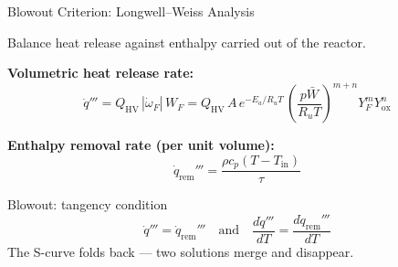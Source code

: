 \documentclass[12pt,aspectratio=169]{beamer}
\newcommand{\taures}{\tau}
\newcommand{\Tin}{T_{\text{in}}}
\begin{document}
\begin{frame}{Blowout Criterion: Longwell--Weiss Analysis}

  Balance heat release against enthalpy carried out of the reactor.

  \medskip
  \textbf{Volumetric heat release rate:}
  \[
    \dot{q}''' = Q_{\text{HV}}\,|\dot{\omega}_F|\,W_F
    = Q_{\text{HV}}\,A\,e^{-E_a/R_u T}\,
      \left(\frac{p\bar{W}}{R_u T}\right)^{m+n}
      Y_F^m Y_{\text{ox}}^n
  \]

  \textbf{Enthalpy removal rate (per unit volume):}
  \[
    \dot{q}_{\text{rem}}''' = \frac{\rho c_p (T-\Tin)}{\taures}
  \]

  \begin{alertblock}{Blowout: tangency condition}
    \[
      \dot{q}''' = \dot{q}_{\text{rem}}'''
      \quad \text{and} \quad
      \frac{d\dot{q}'''}{dT} = \frac{d\dot{q}_{\text{rem}}'''}{dT}
    \]
    The S-curve folds back --- two solutions merge and disappear.
  \end{alertblock}
\end{frame}
\end{document}

